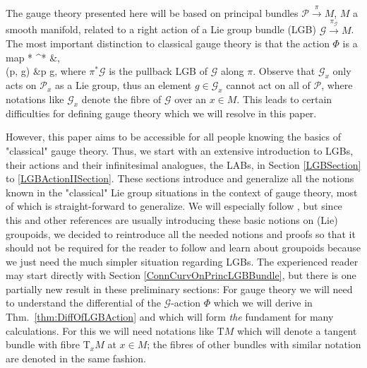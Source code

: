 \documentclass[a4paper,oneside,11pt,bibliography=totoc]{scrartcl}
\def\bas#1\eas{\begin{align*}#1\end{align*}}
\theoremstyle{plain}
\theoremstyle{remark}
\theoremstyle{definition}
\begin{document}
The gauge theory presented here will be based on principal bundles $\mathcal{P} \stackrel{\pi}{\to} M$, $M$ a smooth manifold, related to a right action of a Lie group bundle (LGB) $\mathcal{G} \stackrel{\pi_{\mathcal{G}}}{\to} M$. The most important distinction to classical gauge theory is that the action $\Phi$ is a map
\bas
\mathcal{P} *  \coloneqq \pi^* &\to {},\\
(p, g) &\mapsto p \cdot g,
\eas
where $\pi^*\mathcal{G}$ is the pullback LGB of $\mathcal{G}$ along $\pi$. Observe that $\mathcal{G}_x$ only acts on $\mathcal{P}_x$ as a Lie group, thus an element $g \in \mathcal{G}_x$ cannot act on all of $\mathcal{P}$, where notations like $\mathcal{G}_x$ denote the fibre of $\mathcal{G}$ over an $x \in M$. This leads to certain difficulties for defining gauge theory which we will resolve in this paper.

However, this paper aims to be accessible for all people knowing the basics of "classical" gauge theory. Thus, we start with an extensive introduction to LGBs, their actions and their infinitesimal analogues, the LABs, in Section \ref{LGBSection} to \ref{LGBActionIISection}. These sections introduce and generalize all the notions known in the "classical" Lie group situations in the context of gauge theory, most of which is straight-forward to generalize. We will especially follow \cite{mackenzieGeneralTheory}, but since this and other references are usually introducing these basic notions on (Lie) groupoids, we decided to reintroduce all the needed notions and proofs so that it should not be required for the reader to follow and learn about groupoids because we just need the much simpler situation regarding LGBs. The experienced reader may start directly with Section \ref{ConnCurvOnPrincLGBBundle}, but there is one partially new result in these preliminary sections: For gauge theory we will need to understand the differential of the $\mathcal{G}$-action $\Phi$ which we will derive in Thm.\ \ref{thm:DiffOfLGBAction} and which will form \textit{the} fundament for many calculations. For this we will need notations like $\mathrm{T}M$ which will denote a tangent bundle with fibre $\mathrm{T}_xM$ at $x \in M$; the fibres of other bundles with similar notation are denoted in the same fashion.
\end{document}

